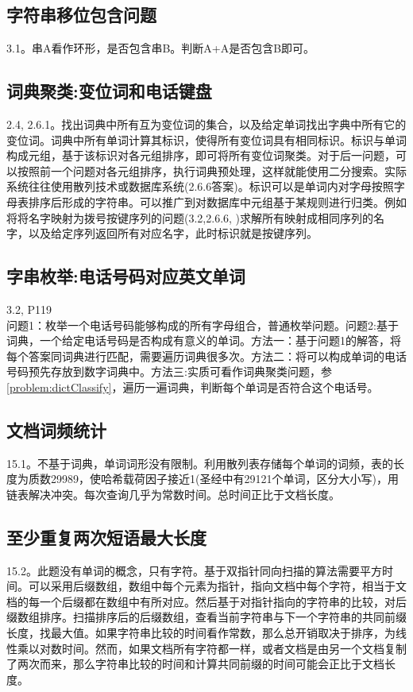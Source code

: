 \subsection{字符串移位包含问题}
\cite{bop}3.1。串A看作环形，是否包含串B。判断A+A是否包含B即可。


\subsection{词典聚类:变位词和电话键盘}
\cite{pp}2.4, 2.6.1。找出词典中所有互为变位词的集合，以及给定单词找出字典中所有它的变位词。词典中所有单词计算其标识，使得所有变位词具有相同标识。标识与单词构成元组，基于该标识对各元组排序，即可将所有变位词聚类。对于后一问题，可以按照前一个问题对各元组排序，执行词典预处理，这样就能使用二分搜索。实际系统往往使用散列技术或数据库系统(\cite{pp}2.6.6答案)。标识可以是单词内对字母按照字母表排序后形成的字符串。可以推广到对数据库中元组基于某规则进行归类。例如将将名字映射为拨号按键序列的问题(\cite{bop}3.2,\cite{pp}2.6.6, \cite{pie})求解所有映射成相同序列的名字，以及给定序列返回所有对应名字，此时标识就是按键序列。
\label{problem:dictClassify}

\subsection{字串枚举:电话号码对应英文单词}
\cite{bop}3.2, \cite{pie}P119\\
问题1：枚举一个电话号码能够构成的所有字母组合，普通枚举问题。问题2:基于词典，一个给定电话号码是否构成有意义的单词。方法一：基于问题1的解答，将每个答案同词典进行匹配，需要遍历词典很多次。方法二：将可以构成单词的电话号码预先存放到数字词典中。方法三:实质可看作词典聚类问题，参\ref{problem:dictClassify}，遍历一遍词典，判断每个单词是否符合这个电话号。
\label{question:phonekeyboard}

\subsection{文档词频统计}
\cite{pp}15.1。不基于词典，单词词形没有限制。利用散列表存储每个单词的词频，表的长度为质数29989，使哈希载荷因子接近1(圣经中有29121个单词，区分大小写)，用链表解决冲突。每次查询几乎为常数时间。总时间正比于文档长度。

\subsection{至少重复两次短语最大长度}
\cite{pp}15.2。此题没有单词的概念，只有字符。基于双指针同向扫描的算法需要平方时间。可以采用后缀数组，数组中每个元素为指针，指向文档中每个字符，相当于文档的每一个后缀都在数组中有所对应。然后基于对指针指向的字符串的比较，对后缀数组排序。扫描排序后的后缀数组，查看当前字符串与下一个字符串的共同前缀长度，找最大值。如果字符串比较的时间看作常数，那么总开销取决于排序，为线性乘以对数时间。然而，如果文档所有字符都一样，或者文档是由另一个文档复制了两次而来，那么字符串比较的时间和计算共同前缀的时间可能会正比于文档长度。

